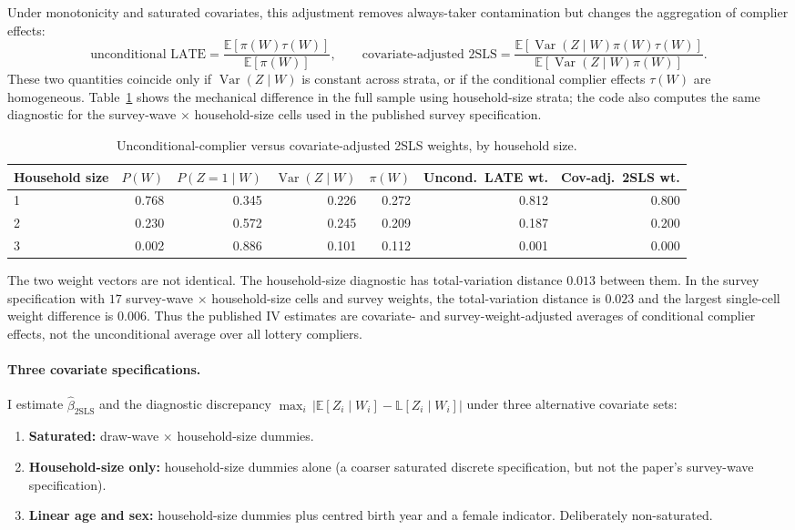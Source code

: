 \documentclass[11pt]{article}
\newcommand{\E}{\mathbb{E}}
\newcommand{\Var}{\operatorname{Var}}
\newcommand{\Lproj}{\mathbb{L}}
\begin{document}
Under monotonicity and saturated covariates, this adjustment removes
always-taker contamination but changes the aggregation of complier
effects:
\[
    \text{unconditional LATE}
      = \frac{\E[\pi(W)\tau(W)]}{\E[\pi(W)]},
    \qquad
    \text{covariate-adjusted 2SLS}
      = \frac{\E[\Var(Z\mid W)\pi(W)\tau(W)]}
             {\E[\Var(Z\mid W)\pi(W)]}.
\]
These two quantities coincide only if $\Var(Z\mid W)$ is constant across
strata, or if the conditional complier effects $\tau(W)$ are homogeneous.
Table~\ref{tab:late-weighting} shows the mechanical difference in the
full sample using household-size strata; the code also computes the same
diagnostic for the survey-wave $\times$ household-size cells used in the
published survey specification.

\begin{table}[H]\centering\footnotesize
\caption{Unconditional-complier versus covariate-adjusted 2SLS weights,
by household size.}
\label{tab:late-weighting}
\begin{tabular}{lrrrrrr}
\toprule
Household size & $P(W)$ & $P(Z=1\mid W)$ & $\Var(Z\mid W)$
 & $\pi(W)$ & Uncond.\ LATE wt. & Cov-adj.\ 2SLS wt. \\
\midrule
1 & 0.768 & 0.345 & 0.226 & 0.272 & 0.812 & 0.800 \\
2 & 0.230 & 0.572 & 0.245 & 0.209 & 0.187 & 0.200 \\
3 & 0.002 & 0.886 & 0.101 & 0.112 & 0.001 & 0.000 \\
\bottomrule
\end{tabular}
\end{table}

The two weight vectors are not identical. The household-size diagnostic
has total-variation distance $0.013$ between them. In the survey
specification with $17$ survey-wave $\times$ household-size cells and
survey weights, the total-variation distance is $0.023$ and the largest
single-cell weight difference is $0.006$. Thus the published IV
estimates are covariate- and survey-weight-adjusted averages of
conditional complier effects, not the unconditional average over all
lottery compliers.

\paragraph{Three covariate specifications.}
I estimate $\hat\beta_{\text{2SLS}}$ and the diagnostic discrepancy
$\max_{i}\,|\E[Z_{i}\mid W_{i}]-\Lproj[Z_{i}\mid W_{i}]|$ under three
alternative covariate sets:
\begin{enumerate}[leftmargin=*,itemsep=2pt]
    \item \textbf{Saturated:} draw-wave $\times$ household-size dummies.
    \item \textbf{Household-size only:} household-size dummies alone
        (a coarser saturated discrete specification, but not the paper's
        survey-wave specification).
    \item \textbf{Linear age and sex:} household-size dummies plus
        centred birth year and a female indicator. Deliberately
        non-saturated.
\end{enumerate}
\end{document}
